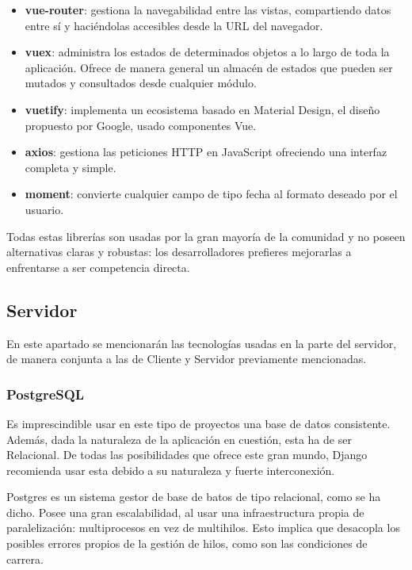 \begin{itemize}
    \item \textbf{vue-router}: gestiona la navegabilidad entre las vistas, compartiendo datos entre sí y haciéndolas accesibles desde la URL del navegador.
    \item \textbf{vuex}: administra los estados de determinados objetos a lo largo de toda la aplicación. Ofrece de manera general un almacén de estados que pueden ser mutados y consultados desde cualquier módulo.
    \item \textbf{vuetify}: implementa un ecosistema basado en Material Design, el diseño propuesto por Google, usado componentes Vue.
    \item \textbf{axios}: gestiona las peticiones HTTP en JavaScript ofreciendo una interfaz completa y simple.
    \item \textbf{moment}: convierte cualquier campo de tipo fecha al formato deseado por el usuario.
\end{itemize}

Todas estas librerías son usadas por la gran mayoría de la comunidad y no poseen alternativas claras y robustas: los desarrolladores prefieres mejorarlas a enfrentarse a ser competencia directa.

\subsection{Servidor}

En este apartado se mencionarán las tecnologías usadas en la parte del servidor, de manera conjunta a las de Cliente y Servidor previamente mencionadas.

\subsubsection{PostgreSQL}

Es imprescindible usar en este tipo de proyectos una base de datos consistente. Además, dada la naturaleza de la aplicación en cuestión, esta ha de ser Relacional. De todas las posibilidades que ofrece este gran mundo, Django recomienda usar esta debido a su naturaleza y fuerte interconexión.

Postgres es un sistema gestor de base de batos de tipo relacional, como se ha dicho. Posee una gran escalabilidad, al usar una infraestructura propia de paralelización: multiprocesos en vez de multihilos. Esto implica que desacopla los posibles errores propios de la gestión de hilos, como son las condiciones de carrera.

